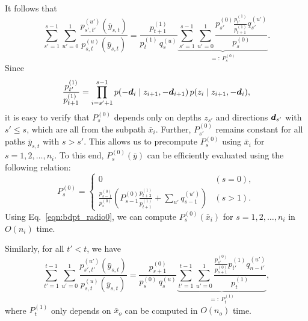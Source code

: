 \documentclass[11pt]{article}
\begin{document}
%
%
It follows that
%
\begin{equation}
\label{eqn:bdpt_pdf_ratio_1}
\sum_{s' = 1}^{s - 1} \sum_{u' = 0}^1 \frac{p^{(u')}_{s', t'}(\bar{y}_{s,t})}{p^{(u)}_{s,t}(\bar{y}_{s,t})}
= \frac{p^{(1)}_{t + 1}}{p^{(1)}_t \, q^{(u)}_s}
\underbrace{\sum_{s' = 1}^{s - 1} \sum_{u' = 0}^1 \frac{p^{(0)}_{s'} \frac{p^{(1)}_{t'}}{p^{(1)}_{t + 1}} q^{(u')}_{s'}}{p^{(0)}_s}}_{=:\ P^{(0)}_s}.
\end{equation}
%
Since
%
\begin{equation}
\frac{p^{(1)}_{t'}}{p^{(1)}_{t + 1}}
= \prod_{i = s' + 1}^{s - 1} p( -\bm{d}_i \;|\; z_{i + 1}, -\bm{d}_{i + 1} ) \, p( z_i \;|\; z_{i + 1}, -\bm{d}_i ),
\end{equation}
%
it is easy to verify that $P^{(0)}_s$ depends only on depths $z_{s'}$ and directions $\bm{d}_{s'}$ with $s' \leq s$, which are all from the subpath $\bar{x}_i$.
Further, $P^{(0)}_{s'}$ remains constant for all paths $\bar{y}_{s,t}$ with $s > s'$.
This allows us to precompute $P^{(0)}_s$ using $\bar{x}_i$ for $s = 1, 2, \ldots, n_i$.
To this end, $P^{(0)}_s(\bar{y})$ can be efficiently evaluated using the following relation:
%
\begin{equation}
\label{eqn:bdpt_radio0}
P^{(0)}_s = \begin{cases}
0 & (s = 0),\\
\frac{p^{(0)}_{s - 1}}{p^{(0)}_s} \left( P^{(0)}_{s - 1} \frac{p^{(1)}_{t + 2}}{p^{(1)}_{t + 1}} + \sum_{u'} q^{(u')}_{s - 1} \right) & (s > 1).
\end{cases}
\end{equation}
%
Using Eq.~\eqref{eqn:bdpt_radio0}, we can compute $P^{(0)}_s(\bar{x}_i)$ for $s = 1, 2, \ldots, n_i$ in $O(n_i)$ time.

Similarly, for all $t' < t$, we have
%
\begin{equation}
\label{eqn:bdpt_pdf_ratio_2}
\sum_{t' = 1}^{t - 1} \sum_{u' = 0}^1 \frac{p^{(u')}_{s', t'}(\bar{y}_{s,t})}{p^{(u)}_{s,t}(\bar{y}_{s,t})}
= \frac{p^{(0)}_{s + 1}}{p^{(0)}_s \, q^{(u)}_s}
\underbrace{\sum_{t' = 1}^{t - 1} \sum_{u' = 0}^1 \frac{\frac{p^{(0)}_{s'}}{p^{(0)}_{s + 1}} p^{(1)}_{t'} q^{(u')}_{n - t'}}{p^{(1)}_t}}_{=:\ P^{(1)}_t},
\end{equation}
%
where $P^{(1)}_t$ only depends on $\bar{x}_o$ can be computed in $O(n_o)$ time.
\end{document}
